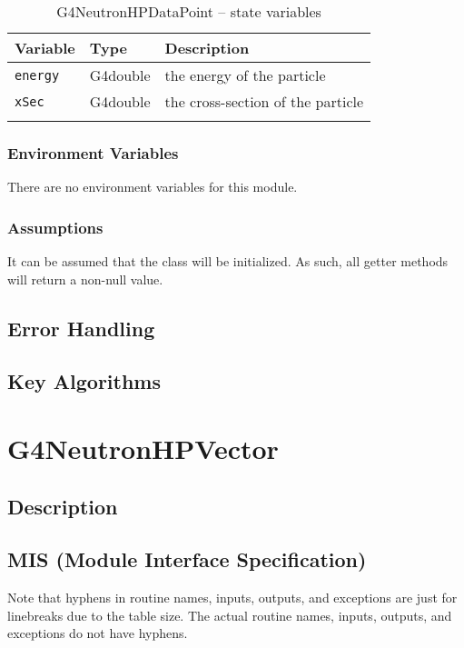 \documentclass[12pt]{article}
\begin{document}
\begin{table}[h]
\caption{G4NeutronHPDataPoint -- state variables}\label{Table_NeutronHPDataPointStateVariables}
\begin{tabularx}{\textwidth}{llX}
\toprule
\bf Variable & \bf Type & \bf Description\\\midrule
\arrayrulecolor{lightgray}
\texttt{energy} & G4double & the energy of the particle \\\hline
\texttt{xSec}   & G4double & the cross-section of the particle \\
\arrayrulecolor{black}
\bottomrule
\end{tabularx}
\end{table}

\subsubsection{Environment Variables}%
There are no environment variables for this module.

\subsubsection{Assumptions}%
It can be assumed that the class will be initialized. As such, all getter methods will return a non-null value.

\subsection{Error Handling}

\subsection{Key Algorithms}


\section{G4NeutronHPVector}

\subsection{Description}

\subsection{MIS (Module Interface Specification)}
Note that hyphens in routine names, inputs, outputs, and exceptions are just for linebreaks due to the table size. The actual routine names, inputs, outputs, and exceptions do not have hyphens.
\end{document}
